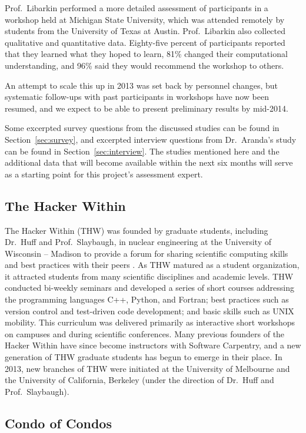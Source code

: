\documentclass{proposalnsf}
\newlength{\up}
\begin{document}
Prof.\ Libarkin performed a more detailed assessment of participants
in a workshop held at Michigan State University, which was attended remotely by students from
the University of Texas at Austin. Prof.\ Libarkin also collected qualitative and quantitative data. Eighty-five percent of participants
reported that they learned what they hoped to learn, 81\% changed
their computational understanding, and 96\% said they would recommend
the workshop to others. 

An attempt to scale this up in 2013 was set back by personnel changes,
but systematic follow-ups with past participants in workshops have now
been resumed, and we expect to be able to present preliminary results
by mid-2014.

Some excerpted survey questions from the discussed studies
can be found in Section~\ref{sec:survey}, and excerpted interview 
questions from Dr.\ Aranda's study can be found in Section~\ref{sec:interview}. The studies mentioned here and the additional data that will become available within the next six months will serve as a starting point for this project's assessment expert. 

\subsection{The Hacker Within}
\label{sec:THW}

The Hacker Within (THW) was founded by graduate students, including Dr.\ Huff and Prof.\ Slaybaugh, in nuclear
engineering at the University of Wisconsin -- Madison to provide a
forum for sharing scientific computing skills and best practices with
their peers \cite{huff2011}. As THW matured as a student organization,
it attracted students from many scientific disciplines and academic
levels. THW conducted bi-weekly seminars and developed a series of
short courses addressing the programming languages C++, Python, and
Fortran; best practices such as version control and test-driven code
development; and basic skills such as UNIX mobility. This curriculum
was delivered primarily as interactive short workshops on campuses and
during scientific conferences. Many previous founders of the Hacker
Within have since become instructors with Software Carpentry, and a
new generation of THW graduate students has begun to emerge in their
place. In 2013, new branches of THW were initiated at the University
of Melbourne and the University of California, Berkeley (under the direction of Dr.\ Huff and Prof.\ Slaybaugh).

\subsection{Condo of Condos}
\label{sec:CofC}
\end{document}
